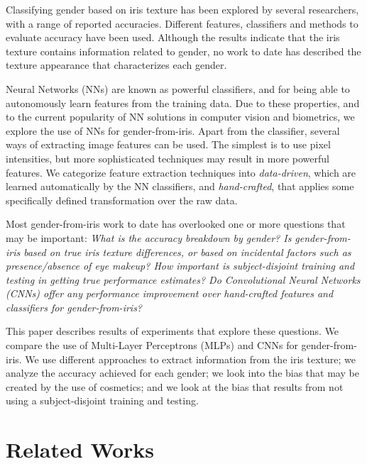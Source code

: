 \documentclass[10pt,twocolumn,letterpaper]{article}
\begin{document}
Classifying gender based on iris texture has been explored by several researchers, with a range of reported accuracies. 
Different features, classifiers and methods to evaluate accuracy have been used.
Although the results indicate that the iris texture contains information related to gender, no work to date has described the texture appearance that characterizes each gender. 

Neural Networks (NNs) are known as powerful classifiers, and for being able to autonomously learn features from the training data. 
Due to these properties, and to the current popularity of NN solutions in computer vision and biometrics, we explore the use of NNs for gender-from-iris.
Apart from the classifier, several ways of extracting image features can be used. 
The simplest is to use pixel intensities, but more sophisticated techniques may result in more powerful features.
We categorize feature extraction techniques into \textit{data-driven}, which are learned automatically by the NN classifiers, and \textit{hand-crafted}, that applies some specifically defined transformation over the raw data.

Most gender-from-iris work to date has overlooked one or more questions that may be important: 
\textit{What is the accuracy breakdown by gender?
Is gender-from-iris based on true iris texture differences, or based on incidental factors such as presence/absence of eye makeup?
How important is subject-disjoint training and testing in getting true performance estimates?
Do Convolutional Neural Networks (CNNs) offer any performance improvement over hand-crafted features and classifiers for gender-from-iris?
}

This paper describes results of experiments that  explore these questions.
We compare the use of Multi-Layer Perceptrons (MLPs) and CNNs for gender-from-iris.
We use different approaches to extract information from the iris texture; we analyze the accuracy achieved for each gender; we look into the bias that may be created by the use of cosmetics; and we look at the bias that results from not using a subject-disjoint training and testing.

\section{Related Works}
\end{document}
